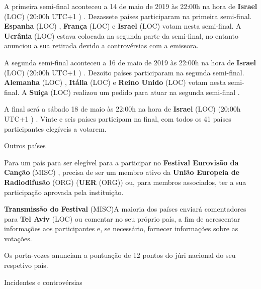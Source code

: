 \documentclass[12pt,a4paper]{article}
\begin{document}
A primeira semi-final aconteceu a 14 de maio de 2019 às 22:00h na hora de \textbf{Israel} (LOC) (20:00h UTC+1 ) . Dezassete países participaram na primeira semi-final. \textbf{Espanha} (LOC) , \textbf{França} (LOC) e \textbf{Israel} (LOC) votam nesta semi-final. A \textbf{Ucrânia} (LOC) estava colocada na segunda parte da semi-final, no entanto anunciou a sua retirada devido a controvérsias com a emissora.

A segunda semi-final aconteceu a 16 de maio de 2019 às 22:00h na hora de \textbf{Israel} (LOC) (20:00h UTC+1 ) . Dezoito países participaram na segunda semi-final. \textbf{Alemanha} (LOC) , \textbf{Itália} (LOC) e \textbf{Reino Unido} (LOC) votam nesta semi-final. A \textbf{Suiça} (LOC) realizou um pedido para atuar na segunda semi-final .

A final será a sábado 18 de maio às 22:00h na hora de \textbf{Israel} (LOC) (20:00h UTC+1 ) . Vinte e seis países participam na final, com todos os 41 países participantes elegíveis a votarem.



Outros países

Para um país para ser elegível para a participar no \textbf{Festival Eurovisão da Canção} (MISC) , precisa de ser um membro ativo da \textbf{União Europeia de Radiodifusão} (ORG) (\textbf{UER} (ORG)) ou, para membros associados, ter a sua participação aprovada pela instituição.



\textbf{Transmissão do Festival} (MISC)A maioria dos países enviará comentadores para \textbf{Tel Aviv} (LOC) ou comentar no seu próprio país, a fim de acrescentar informações aos participantes e, se necessário, fornecer informações sobre as votações.

Os porta-vozes anunciam a pontuação de 12 pontos do júri nacional do seu respetivo país.



Incidentes e controvérsias
\end{document}

